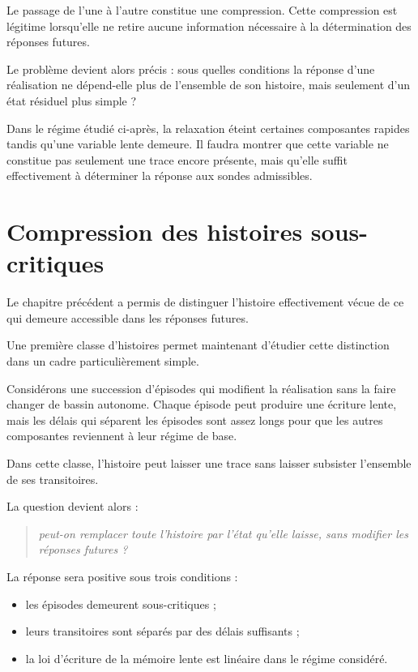 Le passage de l'une à l'autre constitue une compression. Cette compression est légitime lorsqu'elle ne retire aucune information nécessaire à la détermination des réponses futures.

Le problème devient alors précis : sous quelles conditions la réponse d'une réalisation ne dépend-elle plus de l'ensemble de son histoire, mais seulement d'un état résiduel plus simple ?

Dans le régime étudié ci-après, la relaxation éteint certaines composantes rapides tandis qu'une variable lente demeure. Il faudra montrer que cette variable ne constitue pas seulement une trace encore présente, mais qu'elle suffit effectivement à déterminer la réponse aux sondes admissibles.

\chapter{Compression des histoires sous-critiques}
\label{t3-compression-histoires-sous-critiques}

Le chapitre précédent a permis de distinguer l'histoire effectivement vécue de ce qui demeure accessible dans les réponses futures.

Une première classe d'histoires permet maintenant d'étudier cette distinction dans un cadre particulièrement simple.

Considérons une succession d'épisodes qui modifient la réalisation sans la faire changer de bassin autonome. Chaque épisode peut produire une écriture lente, mais les délais qui séparent les épisodes sont assez longs pour que les autres composantes reviennent à leur régime de base.

Dans cette classe, l'histoire peut laisser une trace sans laisser subsister l'ensemble de ses transitoires.

La question devient alors :
\begin{quote}
\itshape peut-on remplacer toute l'histoire par l'état qu'elle laisse, sans modifier les réponses futures ?
\end{quote}

La réponse sera positive sous trois conditions :

\begin{itemize}
\tightlist
\item
  les épisodes demeurent sous-critiques ;
\item
  leurs transitoires sont séparés par des délais suffisants ;
\item
  la loi d'écriture de la mémoire lente est linéaire dans le régime
  considéré.
\end{itemize}

